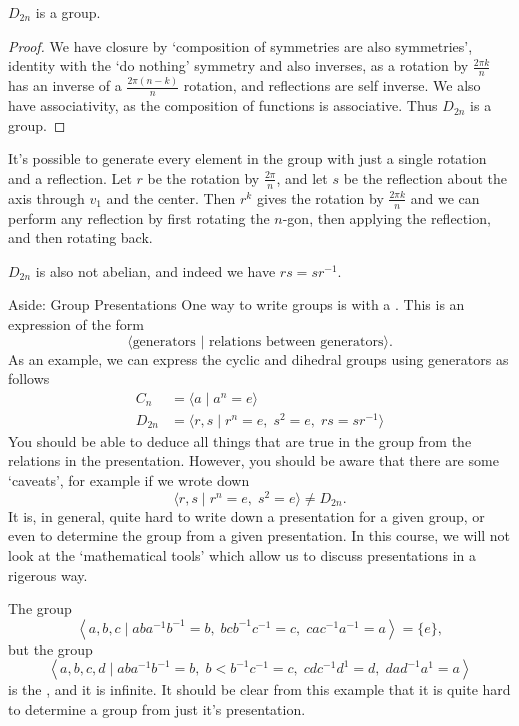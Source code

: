 \documentclass[a4]{scrreprt}
\begin{document}
\begin{proposition}
	$D_{2n}$ is a group.
\end{proposition}
\begin{proof}
	We have closure by `composition of symmetries are also symmetries', identity with the `do nothing' symmetry and also inverses, as a rotation by $\frac{2 \pi k}{n}$ has an inverse of a $\frac{2\pi(n - k)}{n}$ rotation, and reflections are self inverse. We also have associativity, as the composition of functions is associative. Thus $D_{2n}$ is a group. 
\end{proof}

It's possible to generate every element in the group with just a single rotation and a reflection. Let $r$ be the rotation by $\frac{2\pi}{n}$, and let $s$ be the reflection about the axis through $v_1$ and the center. Then $r^k$ gives the rotation by $\frac{2 \pi k}{n}$ and we can perform any reflection by first rotating the $n$-gon, then applying the reflection, and then rotating back. 

$D_{2n}$ is also not abelian, and indeed we have $rs = sr^{-1}$.

\begin{aside}{Aside: Group Presentations}
One way to write groups is with a . This is an expression of the form
$$
\langle \text{generators } \lvert \text{ relations between generators} \rangle.
$$
As an example, we can express the cyclic and dihedral groups using generators as follows
\begin{align*}
	C_n &= \langle a\mid  a^n = e \rangle \\
	D_{2n} &= \langle r, s \mid r^n = e,\; s^2 = e,\; rs = sr^{-1} \rangle
\end{align*}
You should be able to deduce all things that are true in the group from the relations in the presentation. However, you should be aware that there are some `caveats', for example if we wrote down
$$
\langle r, s \mid r^n = e, \; s^2 = e \rangle \neq D_{2n}.
$$
It is, in general, quite hard to write down a presentation for a given group, or even to determine the group from a given presentation. In this course, we will not look at the `mathematical tools' which allow us to discuss presentations in a rigerous 
way.

\begin{example}
	The group
	$$
	\left\langle a, b, c \mid a b a^{-1} b^{-1}=b, \; b c b^{-1} c^{-1}=c, \; cac^{-1} a^{-1}=a\right\rangle=\{e\},
	$$
	but the group
	$$
	\left\langle a, b, c, d \mid a b a^{-1} b^{-1}=b, \; b<b^{-1} c^{-1}=c,\; c d c^{-1} d^{1}=d, \; d a d^{-1} a^{1}=a\right\rangle
	$$
	is the , and it is infinite. It should be clear from this example that it is quite hard to determine a group from just it's presentation.
\end{example}

\end{aside}
\end{document}
